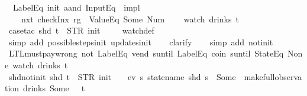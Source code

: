 \begin{isabellebody}
{\ \ {\isachardoublequoteopen}{\isacharparenleft}{\isacharparenleft}LabelEq\ {\isacharprime}{\isacharprime}init{\isacharprime}{\isacharprime}\ aand\ InputEq\ {\isacharbrackleft}{\isacharbrackright}{\isacharparenright}\ impl\isanewline
\ \ \ \ {\isacharparenleft}nxt\ {\isacharparenleft}checkInx\ rg\ {}\ ValueEq\ {\isacharparenleft}Some\ {\isacharparenleft}Num\ {}{\isacharparenright}{\isacharparenright}{\isacharparenright}{\isacharparenright}{\isacharparenright}\isanewline
\ \ \ {\isacharparenleft}watch\ drinks\ t{\isacharparenright}{\isachardoublequoteclose}%
}%
%
\isadelimproof
\ \ %
\endisadelimproof
%
\isatagproof
{}\isamarkupfalse%
\ {\isacharparenleft}case{\isacharunderscore}tac\ {\isachardoublequoteopen}shd\ t\ {\isacharequal}\ {\isacharparenleft}STR\ {\isacharprime}{\isacharprime}init{\isacharprime}{\isacharprime}{\isacharcomma}\ {\isacharbrackleft}{\isacharbrackright}{\isacharparenright}{\isachardoublequoteclose}{\isacharparenright}\isanewline
\ \ \isamarkupfalse%
\ watch{\isacharunderscore}def\isanewline
\ \ \ \isamarkupfalse%
\ {\isacharparenleft}simp\ add{\isacharcolon}\ possible{\isacharunderscore}steps{\isacharunderscore}init\ updates{\isacharunderscore}init{\isacharparenright}\isanewline
\ \ \isamarkupfalse%
\ clarify\isanewline
\ \ \isamarkupfalse%
\ {\isacharparenleft}simp\ add{\isacharcolon}\ not{\isacharunderscore}init{\isacharparenright}%
\endisatagproof
{\isafoldproof}%
%
\isadelimproof
%
\endisadelimproof
\isanewline
\isanewline
\isanewline
{}\isamarkupfalse%
\ LTL{\isacharunderscore}must{\isacharunderscore}pay{\isacharunderscore}wrong{\isacharcolon}\ {\isachardoublequoteopen}{\isacharparenleft}{\isacharparenleft}not\ {\isacharparenleft}LabelEq\ {\isacharprime}{\isacharprime}vend{\isacharprime}{\isacharprime}\ suntil\ LabelEq\ {\isacharprime}{\isacharprime}coin{\isacharprime}{\isacharprime}{\isacharparenright}{\isacharparenright}\ suntil\ StateEq\ None{\isacharparenright}\ {\isacharparenleft}watch\ drinks\ t{\isacharparenright}{\isachardoublequoteclose}\isanewline
%
\isadelimproof
\ \ %
\endisadelimproof
%
\isatagproof
{}\isamarkupfalse%
%
\endisatagproof
{\isafoldproof}%
%
\isadelimproof
\isanewline
%
\endisadelimproof
\isanewline
{}\isamarkupfalse%
\ shd{\isacharunderscore}not{\isacharunderscore}init{\isacharcolon}\ {\isachardoublequoteopen}shd\ t\ {\isasymnoteq}\ {\isacharparenleft}STR\ {\isacharprime}{\isacharprime}init{\isacharprime}{\isacharprime}{\isacharcomma}\ {\isacharbrackleft}{\isacharbrackright}{\isacharparenright}\ {\isasymLongrightarrow}\ {\isasymnot}\ ev\ {\isacharparenleft}{\isasymlambda}s{\isachardot}\ statename\ {\isacharparenleft}shd\ s{\isacharparenright}\ {\isacharequal}\ Some\ {}{\isacharparenright}\ {\isacharparenleft}make{\isacharunderscore}full{\isacharunderscore}observation\ drinks\ {\isacharparenleft}Some\ {}{\isacharparenright}\ {\isacharless}{\isachargreater}\ t{\isacharparenright}{\isachardoublequoteclose}\isanewline

\end{isabellebody}
